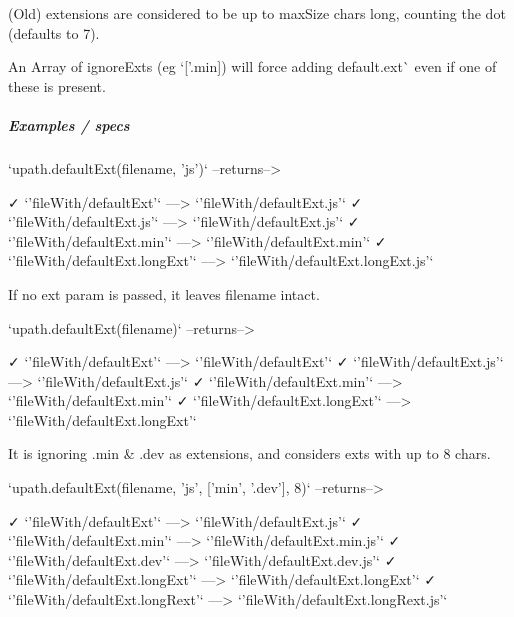 \begin{DoxyItemize}
\item (Old) extensions are considered to be up to {\ttfamily max\+Size} chars long, counting the dot (defaults to 7).
\item An {\ttfamily Array} of {\ttfamily ignore\+Exts} (eg `\mbox{[}'.min\textquotesingle{}\mbox{]}{\ttfamily ) will force adding default}.ext\`{} even if one of these is present.
\end{DoxyItemize}

\subparagraph*{Examples / specs}

\begin{DoxyVerb}`upath.defaultExt(filename, 'js')`   --returns-->

    ✓ `'fileWith/defaultExt'`              --->              `'fileWith/defaultExt.js'`
    ✓ `'fileWith/defaultExt.js'`           --->              `'fileWith/defaultExt.js'`
    ✓ `'fileWith/defaultExt.min'`          --->             `'fileWith/defaultExt.min'`
    ✓ `'fileWith/defaultExt.longExt'`      --->      `'fileWith/defaultExt.longExt.js'`
\end{DoxyVerb}


If no {\ttfamily ext} param is passed, it leaves filename intact. \begin{DoxyVerb}`upath.defaultExt(filename)`       --returns-->

      ✓ `'fileWith/defaultExt'`              --->                 `'fileWith/defaultExt'`
      ✓ `'fileWith/defaultExt.js'`           --->              `'fileWith/defaultExt.js'`
      ✓ `'fileWith/defaultExt.min'`          --->             `'fileWith/defaultExt.min'`
      ✓ `'fileWith/defaultExt.longExt'`      --->         `'fileWith/defaultExt.longExt'`
\end{DoxyVerb}


It is ignoring {\ttfamily .min} \& {\ttfamily .dev} as extensions, and considers exts with up to 8 chars. \begin{DoxyVerb}`upath.defaultExt(filename, 'js', ['min', '.dev'], 8)` --returns-->

      ✓ `'fileWith/defaultExt'`               --->               `'fileWith/defaultExt.js'`
      ✓ `'fileWith/defaultExt.min'`           --->           `'fileWith/defaultExt.min.js'`
      ✓ `'fileWith/defaultExt.dev'`           --->           `'fileWith/defaultExt.dev.js'`
      ✓ `'fileWith/defaultExt.longExt'`       --->          `'fileWith/defaultExt.longExt'`
      ✓ `'fileWith/defaultExt.longRext'`      --->      `'fileWith/defaultExt.longRext.js'`
\end{DoxyVerb}


